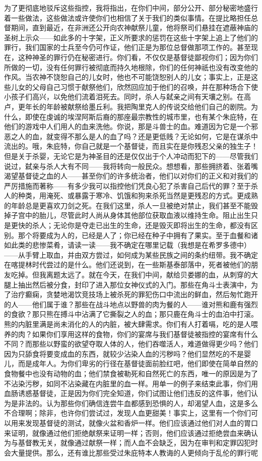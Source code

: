 为了更彻底地驳斥这些指控，我将指出，在你们中间，部分公开、部分秘密地盛行着一些做法，这些做法或许使你们也相信了关于我们的类似事情。在提比略担任总督期间，直到最近，在非洲还公开向农神献祭儿童，他将祭司们悬挂在遮蔽神庙的圣树上示众——如此多的十字架，正义所要求的惩罚在这些十字架上追上了他们的罪行，我们国家的士兵至今仍可作证，他们正是为那位总督做那项工作的。甚至现在，这种神圣的罪行仍在秘密进行。你们看，不仅仅是基督徒鄙视你们；因为你们所做的一切，没有任何罪行被彻底而持久地根除，你们的任何神祇也没有改变他的作风。当农神不饶恕自己的儿女时，他也不可能饶恕别人的儿女；事实上，正是这些儿女的父母自己习惯于献祭他们，欣然回应加于他们的召唤，并在那种场合下使小孩子们高兴，以免他们流着泪死去。同时，杀人与弑亲之间有天壤之别。在高卢，更年长的年龄被献祭给墨丘利。我把陶里克人的传说交给他们自己的剧院。为什么，即使在虔诚的埃涅阿斯后裔的那座最宗教性的城市里，也有某个朱庇特，在他们的游戏中人们用人的血来洗他。你说，那是斗兽士的血。难道因为它是一个邪恶之人的血，就变得不那么是人的血了吗？还是更低贱？无论如何，它是在谋杀中流出的。哦，朱庇特，你自己就是一个基督徒，而且实在是你残忍父亲的独生子！但是关于杀婴，无论它是为神圣目的还是仅仅出于个人冲动而犯下的——尽管我们说过，弑亲与杀人大有不同——我将转向一般民众。想想看，那些拥挤着、张着嘴渴望基督徒之血的人——甚至你们的许多统治者，他们以对你们的正义和对我们的严厉措施而著称——有多少我可以指控他们凭良心犯了杀害自己后代的罪？至于杀人的种类，用淹死、或暴露于寒冷、饥饿和狗来杀死当然是更残忍的方式。更成熟的年龄总是更喜欢刀剑之死。在我们这里，杀人一旦被绝对禁止，我们甚至不能毁掉子宫中的胎儿，尽管此时人尚从身体其他部位获取血液以维持生命。阻止出生只是更快的杀人；无论你是夺走已出生的生命，还是毁灭即将出生的生命，都没有区别。那个将要成为人的，已经是人了；你已经在种子中拥有了果实。至于血餐和诸如此类的悲惨菜肴，请读一读——我不确定在哪里记载（我想是在希罗多德中）——从手臂上取血，并由双方尝过，如何成为某些民族之间的条约纽带。我不确定在喀提林时代尝过的是什么。他们还说到，在一些斯基泰部落中，死者被他们的朋友吃掉。但我离题太远了。就在今天，在我们中间，献给贝娄娜的血，从刺穿的大腿上抽出然后被分食，封印了进入那位女神仪式的入门。那些在角斗士表演中，为了治疗癫痫，贪婪地渴饮竞技场上被杀死的罪犯伤口中流出的鲜血，然后匆忙跑开的人——他们属于谁？那些在战斗地点以野兽的肉为餐的人——谁对熊和鹿有强烈的食欲？那只熊在搏斗中沾满了它撕裂之人的血；那只鹿在角斗士的血泊中打滚。熊的内脏里满是尚未消化的人的内脏，被大肆需求。你们有人打着嗝，吃的是人喂养的肉？如果你们享用这样的食物，你们的宴席与我们基督徒被指控的宴席有什么不同？而那些以野蛮的欲望夺取人体的人，他们吞噬活人，难道做得更少吗？他们因为只舔食将要变成血的东西，就较少沾染人血的污秽吗？他们显然吃的不是婴儿，而是成年人。为你们卑劣的行径在基督徒面前脸红吧，他们即使在简单自然的食物餐中也没有动物的血；他们禁食被勒死和自然死亡的东西，唯一的原因是为了不沾染污秽，如同不沾染藏在内脏里的血一样。用单一的例子来结束此事，你们用血肠诱惑基督徒，正是因为你们完全知道，你们试图让他们违反的这件事，他们认为是非法的。认为那些你们确信连尝牛血都感到恐惧的人，却渴望人血，这是多么不合理啊；除非，也许你们尝试过，发现人血更甜美！事实上，这里有一个你们可以用来发现基督徒的测试，就像火盆和香炉一样。他们应该通过他们对人血的胃口来证明，就像通过他们拒绝献祭来证明一样；否则，他们应该通过拒绝尝血来确认为与基督教无关，就像通过献祭一样；而人血不会缺乏，因为在审判和定罪囚犯时会大量提供。那么，还有谁比那些受过朱庇特本人教诲的人更倾向于乱伦的罪行呢